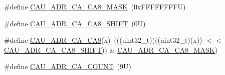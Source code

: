 \begin{DoxyCompactItemize}
\item 
\#define \mbox{\hyperlink{group___c_a_u___register___masks_ga588ce6c296b5bc630763b325bca7e346}{C\+A\+U\+\_\+\+A\+D\+R\+\_\+\+C\+A\+\_\+\+C\+A8\+\_\+\+M\+A\+SK}}~(0x\+F\+F\+F\+F\+F\+F\+F\+F\+U)
\item 
\#define \mbox{\hyperlink{group___c_a_u___register___masks_ga4438c1d48ac4e4e715fdd705f409e0fc}{C\+A\+U\+\_\+\+A\+D\+R\+\_\+\+C\+A\+\_\+\+C\+A8\+\_\+\+S\+H\+I\+FT}}~(0\+U)
\item 
\#define \mbox{\hyperlink{group___c_a_u___register___masks_gad97c6437bc1de70a75242ffd964b973f}{C\+A\+U\+\_\+\+A\+D\+R\+\_\+\+C\+A\+\_\+\+C\+A8}}(x)~(((uint32\+\_\+t)(((uint32\+\_\+t)(x)) $<$$<$ \mbox{\hyperlink{group___c_a_u___register___masks_ga4438c1d48ac4e4e715fdd705f409e0fc}{C\+A\+U\+\_\+\+A\+D\+R\+\_\+\+C\+A\+\_\+\+C\+A8\+\_\+\+S\+H\+I\+FT}})) \& \mbox{\hyperlink{group___c_a_u___register___masks_ga588ce6c296b5bc630763b325bca7e346}{C\+A\+U\+\_\+\+A\+D\+R\+\_\+\+C\+A\+\_\+\+C\+A8\+\_\+\+M\+A\+SK}})
\item 
\#define \mbox{\hyperlink{group___c_a_u___register___masks_gadef0982c45e9a4d2061a507673df13ba}{C\+A\+U\+\_\+\+A\+D\+R\+\_\+\+C\+A\+\_\+\+C\+O\+U\+NT}}~(9\+U)
\end{DoxyCompactItemize}
